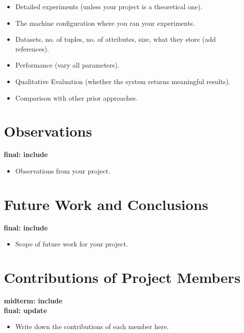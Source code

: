 \documentclass[twocolumn]{article}
\newcommand{\red}[1]{{\bf \color{red}#1}}
\newcommand{\blue}[1]{{\bf \color{blue}#1}}
\begin{document}
\red{
\begin{itemize}
\itemsep0em
\item Detailed experiments (unless your project is a theoretical one).
\item The machine configuration where you ran your experiments.
\item Datasets, no. of tuples, no. of attributes, size, what they store (add references).
\item Performance (vary all parameters).
\item Qualitative Evaluation (whether the system returns meaningful results).
\item Comparison with other prior approaches.
\end{itemize}
}

\section{Observations}
\blue{
final: include\\
}

\red{
\begin{itemize}
\itemsep0em
\item Observations from your project.
\end{itemize}
}


\section{Future Work and Conclusions}
\blue{
final: include\\
}

\red{
\begin{itemize}
\itemsep0em
\item Scope of future work for your project.
\end{itemize}
}


\section{Contributions of Project Members}
\blue{
midterm: include\\
final: update\\
}

\red{
\begin{itemize}
\itemsep0em
\item Write down the contributions of each member here.
\end{itemize}
}
\end{document}
